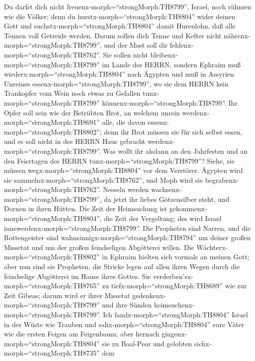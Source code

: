  Du darfst dich nicht freuenx-morph=``strongMorph:TH8799'',
Israel, noch rühmen wie die Völker; denn du
hurstx-morph=``strongMorph:TH8804'' wider deinen Gott und
suchstx-morph=``strongMorph:TH8804'' damit Hurenlohn, daß alle Tennen
voll Getreide werden.  Darum sollen dich Tenne und Kelter
nicht nährenx-morph=``strongMorph:TH8799'', und der Most soll dir
fehlenx-morph=``strongMorph:TH8762''.  Sie sollen nicht
bleibenx-morph=``strongMorph:TH8799'' im Lande des HERRN, sondern
Ephraim muß wiederx-morph=``strongMorph:TH8804'' nach Ägypten und muß in
Assyrien Unreines essenx-morph=``strongMorph:TH8799'',  wo
sie dem HERRN kein Trankopfer vom Wein noch etwas zu Gefallen
tunx-morph=``strongMorph:TH8799'' könnenx-morph=``strongMorph:TH8799''.
Ihr Opfer soll sein wie der Betrübten Brot, an welchem unrein
werdenx-morph=``strongMorph:TH8691'' alle, die davon
essenx-morph=``strongMorph:TH8802''; denn ihr Brot müssen sie für sich
selbst essen, und es soll nicht in des HERRN Haus gebracht
werdenx-morph=``strongMorph:TH8799''.  Was wollt ihr alsdann
an den Jahrfesten und an den Feiertagen des HERRN
tunx-morph=``strongMorph:TH8799''?  Siehe, sie müssen
wegx-morph=``strongMorph:TH8804'' vor dem Verstörer. Ägypten wird sie
sammelnx-morph=``strongMorph:TH8762'', und Moph wird sie
begrabenx-morph=``strongMorph:TH8762''. Nesseln werden
wachsenx-morph=``strongMorph:TH8799'', da jetzt ihr liebes Götzensilber
steht, und Dornen in ihren Hütten.  Die Zeit der Heimsuchung
ist gekommenx-morph=``strongMorph:TH8804'', die Zeit der Vergeltung; des
wird Israel innewerdenx-morph=``strongMorph:TH8799''. Die Propheten sind
Narren, und die Rottengeister sind
wahnsinnigx-morph=``strongMorph:TH8794'' um deiner großen Missetat und
um der großen feindseligen Abgötterei willen.  Die
Wächterx-morph=``strongMorph:TH8802'' in Ephraim hielten sich vormals an
meinen Gott; aber nun sind sie Propheten, die Stricke legen auf allen
ihren Wegen durch die feindselige Abgötterei im Hause ihres Gottes.
 Sie verderben'sx-morph=``strongMorph:TH8765'' zu
tiefx-morph=``strongMorph:TH8689'' wie zur Zeit Gibeas; darum wird er
ihrer Missetat gedenkenx-morph=``strongMorph:TH8799'' und ihre Sünden
heimsuchenx-morph=``strongMorph:TH8799''.  Ich
fandx-morph=``strongMorph:TH8804'' Israel in der Wüste wie Trauben und
sahx-morph=``strongMorph:TH8804'' eure Väter wie die ersten Feigen am
Feigenbaum; aber hernach gingenx-morph=``strongMorph:TH8804'' sie zu
Baal-Peor und gelobten sichx-morph=``strongMorph:TH8735'' dem
